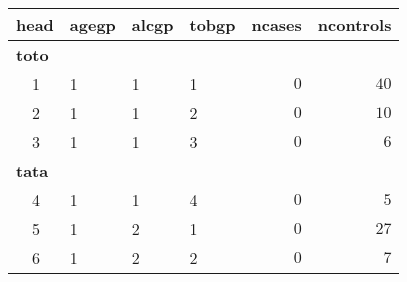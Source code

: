 %
\begin{table}[!tbp]
 \begin{center}
 \begin{tabular}{llllrr}\hline\hline
\multicolumn{1}{l}{head}&\multicolumn{1}{c}{agegp}&\multicolumn{1}{c}{alcgp}&\multicolumn{1}{c}{tobgp}&\multicolumn{1}{c}{ncases}&\multicolumn{1}{c}{ncontrols}\tabularnewline
\hline
{\bfseries toto}&&&&&\tabularnewline
~~1&1&1&1&$0$&$40$\tabularnewline
~~2&1&1&2&$0$&$10$\tabularnewline
~~3&1&1&3&$0$&$ 6$\tabularnewline
\hline
{\bfseries tata}&&&&&\tabularnewline
~~4&1&1&4&$0$&$ 5$\tabularnewline
~~5&1&2&1&$0$&$27$\tabularnewline
~~6&1&2&2&$0$&$ 7$\tabularnewline
\hline
\end{tabular}

\end{center}

\end{table}

